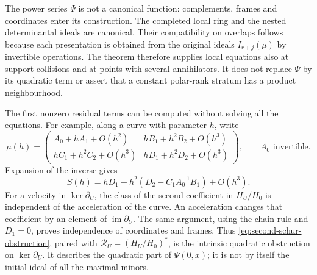 \begin{remark}\label{rem:residual-germ-invariance}
The power series $\Psi$ is not a canonical function: complements,
frames and coordinates enter its construction. The completed local
ring and the nested determinantal ideals are canonical. Their
compatibility on overlaps follows because each presentation is
obtained from the original ideals $I_{r+j}(\mu)$ by invertible
operations. The theorem therefore supplies local equations also at
support collisions and at points with several annihilators. It does
not replace $\Psi$ by its quadratic term or assert that a constant
polar-rank stratum has a product neighbourhood.
\end{remark}

The first nonzero residual terms can be computed without solving all
the equations. For example, along a curve with parameter $h$, write
\[
 \mu(h)=
 \begin{pmatrix}
 A_0+hA_1+O(h^2)&hB_1+h^2B_2+O(h^3)\\
 hC_1+h^2C_2+O(h^3)&hD_1+h^2D_2+O(h^3)
 \end{pmatrix},\qquad A_0\text{ invertible}.
\]
Expansion of the inverse gives
\begin{equation}\label{eq:second-schur-obstruction}
 S(h)=hD_1+h^2(D_2-C_1A_0^{-1}B_1)+O(h^3).
\end{equation}
For a velocity in $\ker\partial_U$, the class of the second
coefficient in $H_U/H_0$ is independent of the acceleration of the
curve. An acceleration changes that coefficient by an element of
$\operatorname{im}\partial_U$. The same argument, using the chain
rule and $D_1=0$, proves independence of coordinates and frames.
Thus \eqref{eq:second-schur-obstruction}, paired with
$\mathcal R_U=(H_U/H_0)^*$, is the intrinsic quadratic obstruction
on $\ker\partial_U$. It describes the quadratic part of
$\Psi(0,x)$; it is not by itself the initial ideal of all the
maximal minors.

